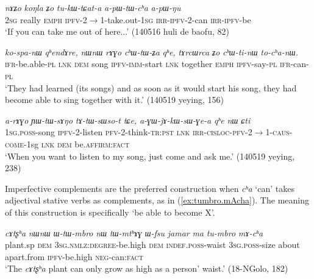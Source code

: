 \documentclass[oneside,a4paper,11pt]{article}
\newcommand{\ipa}[1]{\textit{\phon#1}}
\newcommand{\jpg}[2]{\ipa{#1} `#2'}
\newcommand{\refb}[1]{(\ref{#1})}
\begin{document}
\begin{exe}
\ex \label{ex:tukWtɕata}
\gll 
\ipa{nɤʑo} 	\ipa{koŋla} 	\ipa{ʑo} 	\ipa{tu-kɯ-tɕat-a} 	\ipa{a-pɯ-tɯ-cʰa} 	\ipa{a-pɯ-ŋu} 	\\
\textsc{2sg} really \textsc{emph} \textsc{ipfv}-2$\rightarrow$1-take.out-\textsc{1sg} \textsc{irr-ipfv}-2-can \textsc{irr-ipfv}-be \\
\glt `If you can take me out of here...' (140516 huli de baofu, 82)
\end{exe}

\begin{exe}
\ex \label{ex:chWtinW}
\gll 
\ipa{ko-spa-nɯ} 	\ipa{qʰendɤre,} 	\ipa{nɯnɯ} 	\ipa{rɤɣo} 	\ipa{cʰɯ-tɯ-ʑa} 	\ipa{qʰe,} 	\ipa{tɤrcɯrca} 	\ipa{ʑo} 	\ipa{cʰɯ-ti-nɯ} 	\ipa{to-cʰa-nɯ.} \\
\textsc{ifr}-be.able-\textsc{pl} \textsc{lnk} \textsc{dem} song \textsc{ipfv-imm}-start \textsc{lnk} together \textsc{emph} \textsc{ipfv}-say-\textsc{pl} \textsc{ifr}-can-\textsc{pl} \\
\glt `They had learned (its songs) and as soon as it would start his song, they had become able to sing together with it.' (140519 yeying, 156)
\end{exe}

\begin{exe}
\ex \label{ex:tAtWsWsot}
\gll \ipa{a-rɤɣo} 	\ipa{ɲɯ-tɯ-sɤŋo} 	\ipa{tɤ-tɯ-sɯso-t} 	\ipa{tɕe,} 	\ipa{a-ɣɯ-jɤ-kɯ-sɯ-ɣe-a} 	\ipa{qʰe} 	\ipa{nɯ} 	\ipa{ɕti} \\
\textsc{1sg.poss}-song \textsc{ipfv}-2-listen \textsc{pfv}-2-think-\textsc{tr:pst} \textsc{lnk} \textsc{irr-cisloc-pfv-2$\rightarrow$1-caus-come}-1sg \textsc{lnk} \textsc{dem} be.\textsc{affirm:fact} \\
\glt `When you want to listen to my song, just come and ask me.' (140519 yeying, 238)
\end{exe}

Imperfective complements are the preferred construction when \jpg{cʰa}{can} takes adjectival stative verbs as complements, as in  \refb{ex:tumbro.mAcha}. The meaning of this construction is specifically `be able to become X'.

\begin{exe}
\ex \label{ex:tumbro.mAcha}
\gll \ipa{cɤtʂʰa} 	\ipa{nɯnɯ} 	\ipa{ɯ-tɯ-mbro} 	\ipa{nɯ} 	\ipa{tɯ-mtʰɤɣ} 	\ipa{ɯ-fsu} 	\ipa{jamar} 	\ipa{ma} 	\ipa{tu-mbro} 	\ipa{mɤ-cʰa} \\
plant.sp \textsc{dem} \textsc{3sg.nmlz:degree}-be.high \textsc{dem} \textsc{indef.poss}-waist \textsc{3sg.poss}-size about apart.from \textsc{ipfv}-be.high \textsc{neg}-can:\textsc{fact} \\
\glt `The \ipa{cɤtʂʰa} plant can only grow as high as a person' waist.' (18-NGolo, 182)
\end{exe}
\end{document}
